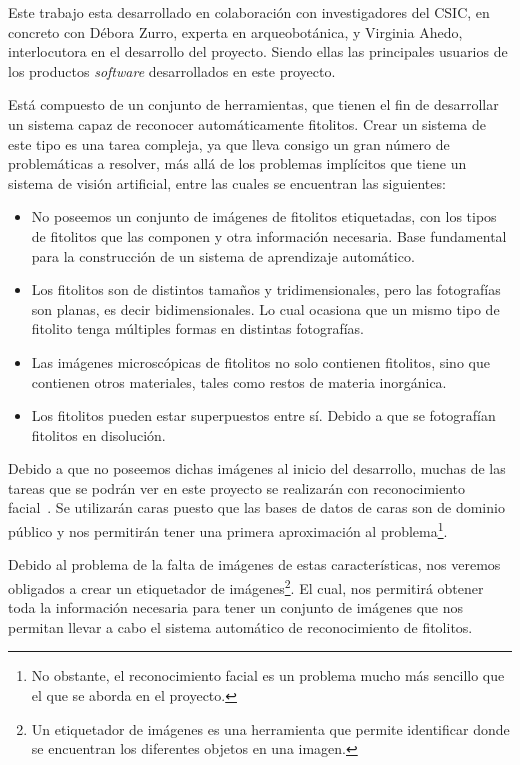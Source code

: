 
Este trabajo esta desarrollado en colaboración con investigadores del CSIC, en concreto con Débora Zurro, experta en arqueobotánica, y Virginia Ahedo, interlocutora en el desarrollo del proyecto. Siendo ellas las principales usuarios de los productos \textit{software} desarrollados en este proyecto. 

Está compuesto de un conjunto de herramientas, que tienen el fin de desarrollar un sistema capaz de reconocer automáticamente fitolitos. Crear un sistema de este tipo es una tarea compleja, ya que lleva consigo un gran número de problemáticas a resolver, más allá de los problemas implícitos que tiene un sistema de visión artificial, entre las cuales se encuentran las siguientes:

\begin{itemize}
	\item No poseemos un conjunto de imágenes de fitolitos etiquetadas, con los tipos de fitolitos que las componen y otra información necesaria. Base fundamental para la construcción de un sistema de aprendizaje automático.
	\item Los fitolitos son de distintos tamaños y tridimensionales, pero las fotografías son planas, es decir bidimensionales. Lo cual ocasiona que un mismo tipo de fitolito tenga múltiples formas en distintas fotografías.
	\item Las imágenes microscópicas de fitolitos no solo contienen fitolitos, sino que contienen otros materiales, tales como restos de materia inorgánica.
	\item Los fitolitos pueden estar superpuestos entre sí. Debido a que se fotografían fitolitos en disolución.
\end{itemize}

Debido a que no poseemos dichas imágenes al inicio del desarrollo, muchas de las tareas que se podrán ver en este proyecto se realizarán con reconocimiento facial~\cite{facedetection}. Se utilizarán caras puesto que las bases de datos de caras son de dominio público y nos permitirán tener una primera aproximación al problema\footnote{No obstante, el reconocimiento facial es un problema mucho más sencillo que el que se aborda en el proyecto.}.

Debido al problema de la falta de imágenes de estas características, nos veremos obligados a crear un etiquetador de imágenes\footnote{Un etiquetador de imágenes es una herramienta que permite identificar donde se encuentran los diferentes objetos en una imagen.}. El cual, nos permitirá obtener toda la información necesaria para tener un conjunto de imágenes que nos permitan llevar a cabo el sistema automático de reconocimiento de fitolitos.

